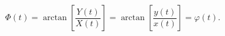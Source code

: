 \begin{equation}
\Phi(t)=\arctan\left[  \frac{Y(t)}{X(t)}\right]  =\arctan\left[  \frac
{y(t)}{x(t)}\right]  =\varphi\left(  t\right)  .\label{43}%
\end{equation}

